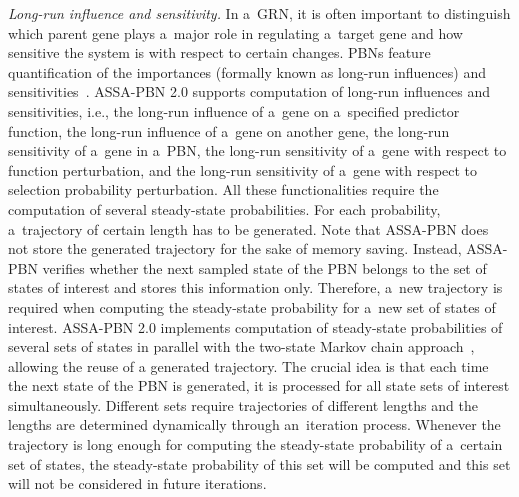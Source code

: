 \documentclass[runningheads,a4paper]{llncs}
\begin{document}
\smallskip\noindent
\emph{Long-run influence and sensitivity.}
In a~GRN, it is often important to distinguish which parent gene plays a~major role in regulating
a~target gene and how sensitive the system is with respect to certain changes. PBNs feature
quantification of the importances (formally known as long-run influences) and
sensitivities~\cite{SDZ02,SD10,QD09}. {\sf ASSA-PBN} 2.0 supports computation of long-run
influences and sensitivities, i.e., the long-run influence of a~gene on a~specified predictor
function, the long-run influence of a~gene on another gene, the long-run sensitivity of a~gene in
a~PBN, the long-run sensitivity of a~gene with respect to function perturbation, and the long-run
sensitivity of a~gene with respect to selection probability perturbation. All these
functionalities require the computation of several steady-state probabilities. For each
probability,  a~trajectory of certain length has to be generated. Note that {\sf ASSA-PBN} does
not store the generated trajectory for the sake of memory saving. Instead, {\sf ASSA-PBN} verifies
whether the next sampled state of the PBN belongs to the set of states of interest and stores this
information only. Therefore, a~new trajectory is required when computing the steady-state
probability for a~new set of states of interest. {\sf ASSA-PBN} 2.0 implements computation of
steady-state probabilities of several sets of states in parallel with the two-state Markov chain
approach~\cite{MPY15b}, allowing the reuse of a generated trajectory. The crucial idea is that each
time the next state of the PBN is generated, it is processed for all state sets of interest
simultaneously. Different sets require trajectories of different lengths and the lengths are
determined dynamically through an~iteration process. Whenever the trajectory is long enough for
computing the steady-state probability of a~certain set of states, the steady-state probability of
this set will be computed and this set will not be considered in future iterations.
\end{document}
